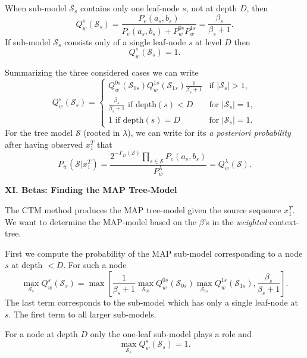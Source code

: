 \documentclass[a4paper,landscape]{slides} %
\newcommand{\cS}{{\mathcal{S}}}
\newcommand{\xT}{x_{1}^{T}}
\newcommand{\GD}{{\Gamma_{D}}}
\begin{document}
\begin{slide}
When sub-model $\cS_{s}$ contains only one leaf-node $s$, not at depth $D$, then
\begin{equation*}
Q_{w}^{s}(\cS_s)
= \frac{ P_e(a_s,b_s) }{ P_e(a_s,b_s) + P_{w}^{0s}P_{w}^{1s} }
= \frac{\beta_{s}}{\beta_{s}+1}.
\end{equation*}
If sub-model $\cS_{s}$ consists only of a single leaf-node $s$ at level $D$ then
\begin{equation*}
Q_{w}^{s}(\cS_s) = 1.
\end{equation*}

Summarizing the three considered cases we can write
\begin{equation*}
\label{eq:defaposteriori}
Q_{w}^{s}(\cS_{s})  =
\left\{\begin{array}{ll}
                Q_{w}^{0s}(\cS_{0s}) Q_{w}^{1s}(\cS_{1s}) \frac{1}{\beta_{s}+1}
                &\mbox{if $|\cS_s|>1$}, \\
                \frac{\beta_{s}}{\beta_{s}+1} \mbox{ if depth$(s)<D$}
                &\mbox{for $|\cS_s|=1$}, \\
                1 \mbox{ if depth$(s)=D$}
                &\mbox{for $|\cS_s|=1$}.
       \end{array} \right.
\end{equation*}
For the tree model $\cS$ (rooted in $\lambda$), we can write for its {\em a posteriori probability} after having observed $\xT$ that
\begin{equation*}
P_{w}(\cS|\xT) = \frac{2^{-\GD(\cS)} \prod_{s\in\cS} P_e(a_s,b_s)
} { P_{w}^{\lambda} } = Q_{w}^{\lambda}(\cS).
\end{equation*}
\end{slide}
\begin{slide}
\end{slide}
\begin{slide}{\bf\Large\color{blue} XI. Betas: Finding the MAP Tree-Model}

The CTM method produces the MAP tree-model given the source sequence $\xT$.
We want to determine the MAP-model based on the $\beta$'s in the {\em weighted} context-tree.

First we compute the probability of the MAP sub-model corresponding to a node $s$ at depth $<D$.
For such a node
\begin{equation*}
\max_{\cS_s} Q_{w}^{s}(\cS_{s}) = \max [ \frac{1}{\beta_{s}+1} \max_{\cS_{0s}} Q_{w}^{0s}(\cS_{0s}) \max_{\cS_{1s}} Q_{w}^{1s}(\cS_{1s}) , \frac{\beta_s}{\beta_{s}+1} ].
\end{equation*}
The last term corresponds to the sub-model which has only a single leaf-node at $s$.
The first term to all larger sub-models.

For a node at depth $D$ only the one-leaf sub-model plays a role and
\begin{equation*}
\max_{\cS_s} Q_{w}^{s}(\cS_{s}) = 1.
\end{equation*}
\end{slide}
\end{document}
